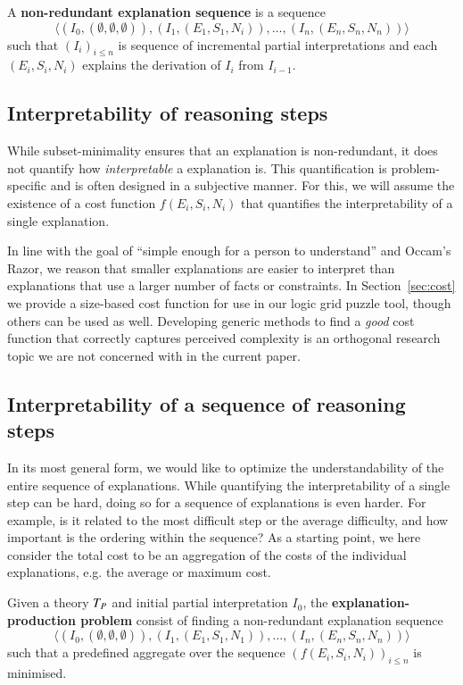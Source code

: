 \begin{definition} \label{def:nonred}
A \textbf{non-redundant explanation sequence} is a sequence 
\[\langle(I_0,(\emptyset,\emptyset,\emptyset)), (I_1,(E_1,S_1,N_i)), \dots ,(I_n,(E_n,S_n,N_n))\rangle\]
such that $(I_i)_{i\leq n}$ is sequence of incremental partial interpretations and each $(E_i,S_i,N_i)$ explains the derivation of $I_i$ from $I_{i-1}$.
\end{definition} 

\subsection{Interpretability of reasoning steps}
While subset-minimality ensures that an explanation is non-redundant, it does not quantify how \textit{interpretable} a explanation is. 
This quantification is problem-specific and is often designed in a subjective manner. 
For this, we will assume the existence of a cost function $f(E_i,S_i,N_i)$ that quantifies the interpretability of a single explanation. 

In line with the goal of ``simple enough for a person to understand'' and Occam's Razor, we reason that smaller explanations are easier to interpret than explanations that use a larger number of facts or constraints.
In Section~\ref{sec:cost} we provide a size-based cost function for use in our logic grid puzzle tool, though others can be used as well.
Developing generic methods to find a \emph{good} cost function that correctly captures perceived complexity is an orthogonal research topic we are not concerned with in the current paper. 

\subsection{Interpretability of a sequence of reasoning steps}
In its most general form, we would like to optimize the understandability of the entire sequence of explanations. 
While quantifying the interpretability of a single step can be hard, doing so for a sequence of explanations is even harder. For example, is it related to the most difficult step or the average difficulty, and how important is the ordering within the sequence?
As a starting point, we here consider the total cost to be an aggregation of the costs of the individual explanations, e.g. the average or maximum cost.

\begin{definition}
Given a theory $T_P$ and initial partial interpretation $I_0$, the \textbf{explanation-production problem} consist of finding a non-redundant explanation sequence
\[\langle(I_0,(\emptyset,\emptyset,\emptyset)), (I_1,(E_1,S_1,N_1)), \dots ,(I_n,(E_n,S_n,N_n))\rangle\]
such that a predefined aggregate over the sequence $\left(f(E_i,S_i,N_i)\right)_{i\leq n}$ is minimised.
\end{definition} 

